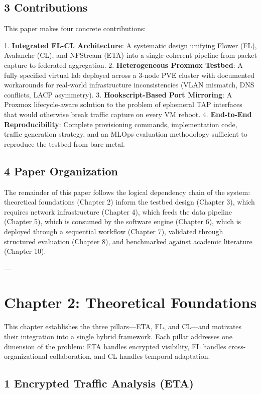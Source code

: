 \documentclass[conference]{IEEEtran}
\begin{document}
\subsection{3 Contributions}

This paper makes four concrete contributions:

1. \textbf{Integrated FL-CL Architecture}: A systematic design unifying Flower (FL), Avalanche (CL), and NFStream (ETA) into a single coherent pipeline from packet capture to federated aggregation.
2. \textbf{Heterogeneous Proxmox Testbed}: A fully specified virtual lab deployed across a 3-node PVE cluster with documented workarounds for real-world infrastructure inconsistencies (VLAN mismatch, DNS conflicts, LACP asymmetry).
3. \textbf{Hookscript-Based Port Mirroring}: A Proxmox lifecycle-aware solution to the problem of ephemeral TAP interfaces that would otherwise break traffic capture on every VM reboot.
4. \textbf{End-to-End Reproducibility}: Complete provisioning commands, implementation code, traffic generation strategy, and an MLOps evaluation methodology sufficient to reproduce the testbed from bare metal.


\subsection{4 Paper Organization}

The remainder of this paper follows the logical dependency chain of the system: theoretical foundations (Chapter 2) inform the testbed design (Chapter 3), which requires network infrastructure (Chapter 4), which feeds the data pipeline (Chapter 5), which is consumed by the software engine (Chapter 6), which is deployed through a sequential workflow (Chapter 7), validated through structured evaluation (Chapter 8), and benchmarked against academic literature (Chapter 10).

---


\section{Chapter 2: Theoretical Foundations}

This chapter establishes the three pillars—ETA, FL, and CL—and motivates their integration into a single hybrid framework. Each pillar addresses one dimension of the problem: ETA handles encrypted visibility, FL handles cross-organizational collaboration, and CL handles temporal adaptation.


\subsection{1 Encrypted Traffic Analysis (ETA)}
\end{document}
